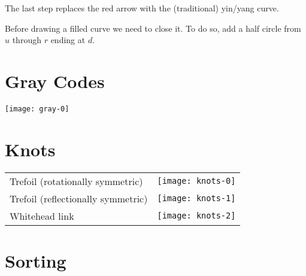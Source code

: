 \documentclass{article}
\begin{document}
The last step replaces the red arrow with the (traditional) yin/yang curve.

Before drawing a filled curve we need to close it.
To do so, add a half circle from $u$ through $r$ ending at $d$.

\section{Gray Codes}
\texttt{[image: gray-0]}

\section{Knots}
\begin{tabular}{lc}
Trefoil (rotationally symmetric)   & \texttt{[image: knots-0]} \\
Trefoil (reflectionally symmetric) & \texttt{[image: knots-1]} \\
Whitehead link                     & \texttt{[image: knots-2]} \\
\end{tabular}

\section{Sorting}
\end{document}

